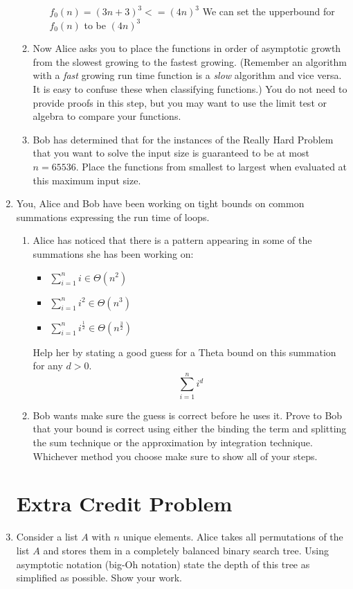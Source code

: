 \documentclass[paper=a4, fontsize=11pt]{scrartcl}
\numberwithin{equation}{section}		%
\numberwithin{figure}{section}			%
\numberwithin{table}{section}				%
\begin{document}
\begin{enumerate}
\begin{enumerate}
\begin{enumerate}
        
         $f_0(n) = (3n + 3)^3 <= (4n)^3$ We can set the upperbound for $f_0(n)$ to be $(4n)^3$ 
    \end{enumerate}
    
\item Now Alice asks you to place the functions in order of asymptotic growth from the slowest growing to the fastest growing. (Remember an algorithm with a \textit{fast} growing run time function is a \textit{slow} algorithm and vice versa. It is easy to confuse these when classifying functions.) You do not need to provide proofs in this step, but you may want to use the limit test or algebra to compare your functions.
\item Bob has determined that for the instances of the Really Hard Problem that you want to solve the input size is guaranteed to be at most $n = 65536$. Place the functions from smallest to largest when evaluated at this maximum input size. 
\end{enumerate}

\item You, Alice and Bob have been working on tight bounds on common summations expressing the run time of loops. 

\begin{enumerate}
\item Alice has noticed that there is a pattern appearing in some of the summations she has been working on:
\begin{itemize}
\item $\sum_{i=1}^{n}i \in \Theta\left(n^2\right)$
\item $\sum_{i=1}^{n}i^2 \in \Theta\left(n^3\right)$
\item $\sum_{i=1}^{n}i^{\frac{1}{2}} \in \Theta\left(n^{\frac{3}{2}}\right)$
\end{itemize}

Help her by stating a good guess for a Theta bound on this summation for any $d>0$.
\[
\sum_{i=1}^ni^d
\]
\item Bob wants make sure the guess is correct before he uses it. Prove to Bob that your bound is correct using either the binding the term and splitting the sum technique or the approximation by integration technique. Whichever method you choose make sure to show all of your steps.
\end{enumerate}

\newpage
\section{Extra Credit Problem}
\item Consider a list $A$ with $n$ unique elements.  Alice takes all permutations of the list $A$ and stores them in a completely balanced binary search tree.  Using asymptotic notation (big-Oh notation) state the depth of this tree as simplified as possible.  Show your work.

\end{enumerate}


\end{document}
